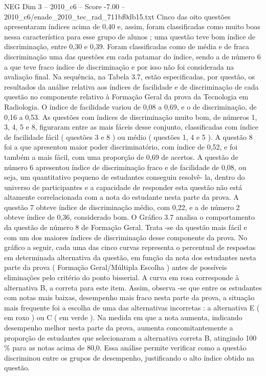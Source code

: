\begin{textsample}{NEG Dim 3 – 2010\_c6 – Score -7.00 – 2010\_c6/enade\_2010\_tec\_rad\_711bf0db15.txt}
Cinco das oito questões apresentaram índices acima de 0,40 e, assim, foram classificadas como muito boas nessa característica para esse grupo de alunos ; uma questão teve bom índice de discriminação, entre 0,30 e 0,39.
Foram classificadas como de média e de fraca discriminação uma das questões em cada patamar do índice, sendo a de número 6 a que teve fraco índice de discriminação e por isso não foi considerada na avaliação final.
Na sequência, na Tabela 3.7, estão especificadas, por questão, os resultados da análise relativa aos índices de facilidade e de discriminação de cada questão no componente relativo à Formação Geral da prova da Tecnologia em Radiologia.
O índice de facilidade variou de 0,08 a 0,69, e o de discriminação, de 0,16 a 0,53.
As questões com índices de discriminação muito bom, de números 1, 3, 4, 5 e 8, figuraram entre as mais fáceis desse conjunto, classificadas com índice de facilidade fácil ( questões 3 e 8 ) ou médio ( questões 1, 4 e 5 ).
A questão 8 foi a que apresentou maior poder discriminatório, com índice de 0,52, e foi também a mais fácil, com uma proporção de 0,69 de acertos.
A questão de número 6 apresentou índice de discriminação fraco e de facilidade de 0,08, ou seja, um quantitativo pequeno de estudantes conseguiu resolvê- la, dentro do universo de participantes e a capacidade de responder esta questão não está altamente correlacionada com a nota do estudante nesta parte da prova.
A questão 7 obteve índice de discriminação médio, com 0,22, e a de número 2 obteve índice de 0,36, considerado bom.
O Gráfico 3.7 analisa o comportamento da questão de número 8 de Formação Geral.
Trata -se da questão mais fácil e com um dos maiores índices de discriminação desse componente da prova.
No gráfico a seguir, cada uma das cinco curvas representa o percentual de respostas em determinada alternativa da questão, em função da nota dos estudantes nesta parte da prova ( Formação Geral/Múltipla Escolha ) antes de possíveis eliminações pelo critério do ponto bisserial.
A curva em rosa corresponde à alternativa B, a correta para este item.
Assim, observa -se que entre os estudantes com notas mais baixas, desempenho mais fraco nesta parte da prova, a situação mais frequente foi a escolha de uma das alternativas incorretas : a alternativa E ( em roxo ) ou C ( em verde ).
Na medida em que a nota aumenta, indicando desempenho melhor nesta parte da prova, aumenta concomitantemente a proporção de estudantes que selecionaram a alternativa correta B, atingindo 100 \% para as notas acima de 80,0.
Essa análise permite verificar como a questão discriminou entre os grupos de desempenho, justificando o alto índice obtido na questão.

\end{textsample}

